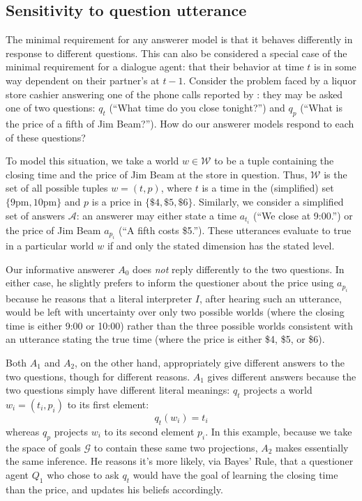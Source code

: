 \documentclass[11pt, floatsintext]{apa6}
\begin{document}
\subsection{Sensitivity to question utterance}

The minimal requirement for any answerer model is that it behaves differently in response to different questions. This can also be considered a special case of the minimal requirement for a dialogue agent: that their behavior at time $t$ is in some way dependent on their partner's at $t-1$. %
Consider the problem faced by a liquor store cashier answering one of the phone calls reported by : they may be asked one of two questions: $q_t$ (``What time do you close tonight?'') and $q_p$ (``What is the price of a fifth of Jim Beam?''). How do our answerer models respond to each of these questions?

To model this situation, we take a world $w \in \mathcal{W}$ to be a tuple containing the closing time and the price of Jim Beam at the store in question. Thus, $\mathcal{W}$ is the set of all possible tuples $w = (t, p)$, where $t$ is a time in the (simplified) set $\{9\textrm{pm},10\textrm{pm}\}$ and $p$ is a price in $\{\$4, \$5, \$6\}$. Similarly, we consider a simplified set of answers $\mathcal{A}$: an answerer may either state a time $a_{t_i}$ (``We close at 9:00.'') or the price of Jim Beam $a_{p_i}$  (``A fifth costs \$5.''). These utterances evaluate to true in a particular world $w$ if and only the stated dimension has the stated level.

Our informative answerer $A_0$ does \emph{not} reply differently to the two questions. In either case, he slightly prefers to inform the questioner about the price using $a_{p_i}$ because he reasons that a literal interpreter $I$, after hearing such an utterance, would be left with uncertainty over only two possible worlds (where the closing time is either 9:00 or 10:00) rather than the three possible worlds consistent with an utterance stating the true time (where the price is either \$4, \$5, or \$6).

Both $A_1$ and $A_2$, on the other hand, appropriately give different answers to the two questions, though for different reasons. $A_1$ gives different answers because the two questions simply have different literal meanings: $q_t$ projects a world $w_i = (t_i, p_i)$ to its first element:$$q_t(w_i) = t_i$$ whereas $q_p$ projects $w_i$ to its second element $p_i$. In this example, because we take the space of goals $\mathcal{G}$ to contain these same two projections, $A_2$ makes essentially the same inference. He reasons it's more likely, via Bayes' Rule, that a questioner agent $Q_1$ who chose to ask $q_t$ would have the goal of learning the closing time than the price, and updates his beliefs accordingly.
\end{document}

